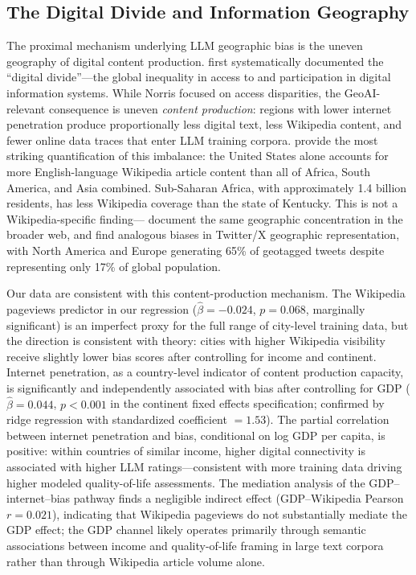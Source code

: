 \documentclass[12pt]{article}
\begin{document}
\subsection{The Digital Divide and Information Geography}

The proximal mechanism underlying LLM geographic bias is the uneven geography of digital content production. \citet{norris2001digital} first systematically documented the ``digital divide''---the global inequality in access to and participation in digital information systems. While Norris focused on access disparities, the GeoAI-relevant consequence is uneven \emph{content production}: regions with lower internet penetration produce proportionally less digital text, less Wikipedia content, and fewer online data traces that enter LLM training corpora. \citet{graham2014uneven} provide the most striking quantification of this imbalance: the United States alone accounts for more English-language Wikipedia article content than all of Africa, South America, and Asia combined. Sub-Saharan Africa, with approximately 1.4 billion residents, has less Wikipedia coverage than the state of Kentucky. This is not a Wikipedia-specific finding---\citet{hecht2010tower} document the same geographic concentration in the broader web, and \citet{johnson2021global} find analogous biases in Twitter/X geographic representation, with North America and Europe generating 65\% of geotagged tweets despite representing only 17\% of global population.

Our data are consistent with this content-production mechanism. The Wikipedia pageviews predictor in our regression ($\hat{\beta} = -0.024$, $p = 0.068$, marginally significant) is an imperfect proxy for the full range of city-level training data, but the direction is consistent with theory: cities with higher Wikipedia visibility receive slightly lower bias scores after controlling for income and continent. Internet penetration, as a country-level indicator of content production capacity, is significantly and independently associated with bias after controlling for GDP ($\hat{\beta} = 0.044$, $p < 0.001$ in the continent fixed effects specification; confirmed by ridge regression with standardized coefficient $= 1.53$). The partial correlation between internet penetration and bias, conditional on log GDP per capita, is positive: within countries of similar income, higher digital connectivity is associated with higher LLM ratings---consistent with more training data driving higher modeled quality-of-life assessments. The mediation analysis of the GDP--internet--bias pathway finds a negligible indirect effect (GDP--Wikipedia Pearson $r = 0.021$), indicating that Wikipedia pageviews do not substantially mediate the GDP effect; the GDP channel likely operates primarily through semantic associations between income and quality-of-life framing in large text corpora rather than through Wikipedia article volume alone.
\end{document}
